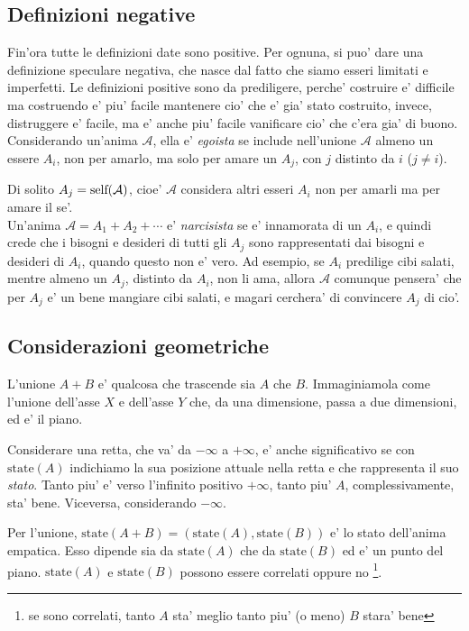 \subsection{Definizioni negative}

Fin'ora tutte le definizioni date sono positive. Per ognuna, si puo' dare una definizione speculare negativa, che nasce dal fatto che siamo esseri limitati e imperfetti. Le definizioni positive sono da prediligere, perche' costruire e' difficile ma costruendo e' piu' facile mantenere cio' che e' gia' stato costruito, invece, distruggere e' facile, ma e' anche piu' facile vanificare cio' che c'era gia' di buono.\\

Considerando un'anima $\mathcal{A}$, ella e' \emph{egoista} se include nell'unione $\mathcal{A}$ almeno un essere $A_i$, non per amarlo, ma solo per amare un $A_j$, con $j$ distinto da $i$ ($j\ne i$).

Di solito $A_j = \textrm{self}(\mathcal{A})$, cioe' $\mathcal{A}$ considera altri esseri $A_i$ non per amarli ma per amare il se'.\\

Un'anima $\mathcal{A}=A_1+A_2+\cdots$ e' \emph{narcisista} se e' innamorata di un $A_i$, e quindi crede che i bisogni e desideri di tutti gli $A_j$ sono rappresentati dai bisogni e desideri di $A_i$, quando questo non e' vero. Ad esempio, se $A_i$ predilige cibi salati, mentre almeno un $A_j$, distinto da $A_i$, non li ama, allora $\mathcal{A}$ comunque pensera' che per $A_j$ e' un bene mangiare cibi salati, e magari cerchera' di convincere $A_j$ di cio'.

\subsection{Considerazioni geometriche}
L'unione $A+B$ e' qualcosa che trascende sia $A$ che $B$. Immaginiamola come l'unione dell'asse $X$ e dell'asse $Y$ che, da una dimensione, passa a due dimensioni, ed e' il piano.

\def\state{\textrm{state}}

Considerare una retta, che va' da $-\infty$ a $+\infty$, e' anche significativo se con $\state(A)$ indichiamo la sua posizione attuale nella retta e che rappresenta il suo \emph{stato}. Tanto piu' e' verso l'infinito positivo $+\infty$, tanto piu' $A$, complessivamente, sta' bene. Viceversa, considerando $-\infty$.

Per l'unione, $\state(A+B)=(\state(A),\state(B))$ e' lo stato dell'anima empatica. Esso dipende sia da $\state(A)$ che da $\state(B)$ ed e' un punto del piano. $\state(A)$ e $\state(B)$ possono essere correlati oppure no \footnote{se sono correlati, tanto $A$ sta' meglio tanto piu' (o meno) $B$ stara' bene}.\\

